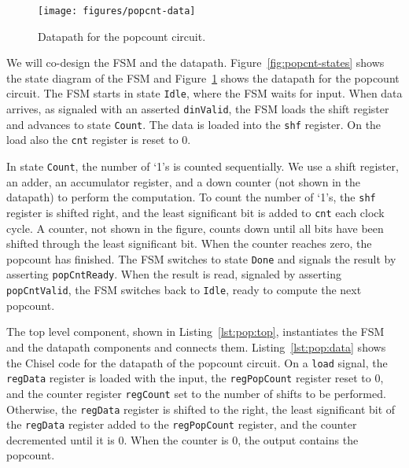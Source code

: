 \documentclass[%
    10pt,
    headinclude, footexclude,
    openright, %
    notitlepage,
    cleardoubleempty,
    headsepline,
    pointlessnumbers,
    bibtotoc, idxtotoc,
    ]{scrbook}
\newcommand{\code}[1]{{\small{\texttt{#1}}}}
\begin{document}
\begin{figure}
  \centering
  \texttt{[image: figures/popcnt-data]}
  \caption{Datapath for the popcount circuit.}
  \label{fig:popcnt-data}
\end{figure}

We will co-design the FSM and the datapath.
Figure~\ref{fig:popcnt-states} shows the state diagram of the FSM and
Figure~\ref{fig:popcnt-data} shows the datapath for the popcount circuit.
The FSM starts in state \code{Idle}, where the FSM waits for input.
When data arrives, as signaled with an asserted \code{dinValid}, the FSM loads the shift register
and advances to state \code{Count}.
The data is loaded into the \code{shf} register. On the load also the \code{cnt}
register is reset to 0.


In state \code{Count}, the number of `1's is counted sequentially.
We use a shift register, an adder, an accumulator
register, and a down counter (not shown in the datapath) to perform the computation.
To count the number of `1's, the \code{shf} register is shifted
right, and the least significant bit is added to \code{cnt} each clock cycle.
A counter, not shown in the figure, counts down until all bits have been shifted
through the least significant bit.
When the counter reaches zero, the popcount
has finished. The FSM switches to state \code{Done} and signals the result
by asserting \code{popCntReady}. When the result is read, signaled by asserting
\code{popCntValid}, the FSM switches back to \code{Idle},
ready to compute the next popcount.


The top level component, shown in Listing~\ref{lst:pop:top}, instantiates the FSM and the datapath
components and connects them.
Listing~\ref{lst:pop:data} shows the Chisel code for the datapath of the popcount
circuit.
On a \code{load} signal, the \code{regData} register is loaded with the input,
the \code{regPopCount} register reset to 0, and the counter register \code{regCount}
set to the number of shifts to be performed.
Otherwise, the \code{regData} register is shifted to the right, the least significant bit
of the \code{regData} register added to the \code{regPopCount} register, and the counter
decremented until it is 0. When the counter is 0, the output contains the popcount.

\newpage
{}
\end{document}
